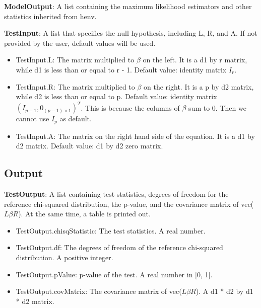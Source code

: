 \documentclass[a4paper,11pt,openany]{memoir}
\begin{document}
\begin{par}
\textbf{ModelOutput}: A list containing the maximum likelihood estimators and other statistics inherited from henv.
\end{par} \vspace{1em}
\begin{par}
\textbf{TestInput}: A list that specifies the null hypothesis, including L, R, and A.  If not provided by the user, default values will be used.
\end{par} \vspace{1em}
\begin{itemize}
\setlength{\itemsep}{-1ex}
   \item TestInput.L: The matrix multiplied to $\beta$ on the left.  It is a d1 by r matrix, while d1 is less than or equal to r - 1.  Default value: identity matrix $I_{r}$.
   \item TestInput.R: The matrix multiplied to $\beta$ on the right.  It is a p by d2 matrix, while d2 is less than or equal to p.  Default value: identity matrix $(I_{p-1}, 0_{(p-1)\times 1})^{T}$.  This is because the columns of $\beta$ sum to 0.  Then we cannot use $I_p$ as default.
   \item TestInput.A: The matrix on the right hand side of the equation.  It is a d1 by d2 matrix.  Default value: d1 by d2 zero matrix.
\end{itemize}


\subsection*{Output}

\begin{par}
\textbf{TestOutput}: A list containing test statistics, degrees of freedom for the reference chi-squared distribution, the p-value, and the covariance matrix of vec($L\beta R$).  At the same time, a table is printed out.
\end{par} \vspace{1em}
\begin{itemize}
\setlength{\itemsep}{-1ex}
   \item TestOutput.chisqStatistic: The test statistics. A real number.
   \item TestOutput.df: The degrees of freedom of the reference chi-squared distribution.  A positive integer.
   \item TestOutput.pValue: p-value of the test.  A real number in [0, 1].
   \item TestOutput.covMatrix: The covariance matrix of vec($L\beta R$). A d1 * d2 by d1 * d2 matrix.
\end{itemize}
\end{document}
